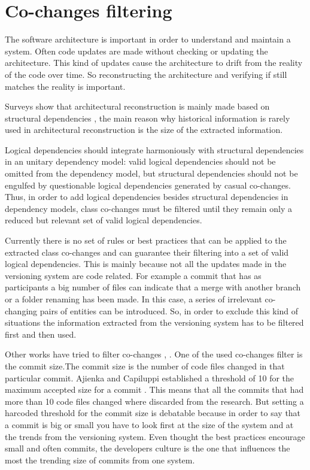 \documentclass[12pt]{mitthesis}
\begin{document}
\chapter{Co-changes filtering}
The software architecture is important in order to understand and maintain a system. Often code updates are made without checking or updating the architecture. This kind of updates cause the architecture to drift from the reality of the code over time.\cite{sar}
So reconstructing the architecture and verifying if still matches the reality is important. 

Surveys show that architectural reconstruction is mainly made based on structural dependencies \cite{Shtern:2012:CMS:2332427.2332428} \cite{sar}, the main reason why historical information is rarely used in architectural reconstruction is the size of the extracted information.

Logical dependencies should integrate harmoniously with structural dependencies in an unitary dependency model: valid logical dependencies should not be omitted from the dependency model, but structural dependencies should not be engulfed by questionable logical dependencies generated by casual co-changes.  
Thus, in order to add logical dependencies besides structural dependencies in dependency models, class co-changes must be filtered until they remain only a reduced but relevant set of valid logical dependencies. 

Currently there is no set of rules or best practices that can be applied to the extracted class co-changes and can guarantee their filtering into a set of valid logical dependencies.
This is mainly because not all the updates made in the versioning system are code related. For example a commit that has as participants a big number of files can indicate that a merge with another branch or a folder renaming has been made. In this case, a series of irrelevant co-changing pairs of entities can be introduced. So, in order to exclude this kind of situations the information extracted from the versioning system has to be filtered first and then used.

Other works have tried to filter co-changes \cite{Oliva:2011:ISL:2067853.2068086}, \cite{DBLP:journals/jss/AjienkaC17}. One of the used co-changes filter is the commit size.The commit size is the number of code files changed in that particular commit. 
Ajienka and Capiluppi established a threshold of 10 for the maximum accepted size for a commit \cite{DBLP:journals/jss/AjienkaC17}. This means that all the commits that had more than 10 code files changed where discarded from the research. But setting a harcoded threshold for the commit size is debatable because in order to say that a commit is big or small you have to look first at the size of the system and at the trends from the versioning system. Even thought the best practices encourage small and often commits, the developers culture is the one that influences the most the trending size of commits from one system.
\end{document}
